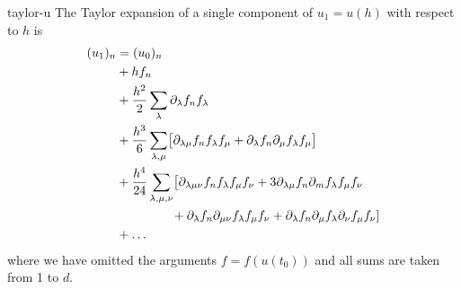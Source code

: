 \begin{Lemma}{taylor-u}
  The Taylor expansion of a single component of $u_1 = u(h)$ with
  respect to $h$ is
  \begin{gather}
    \label{eq:taylor-u:1}
    \begin{split}
      (u_1)_n &= (u_0)_n
      \\& + h f_n
      \\& + \frac{h^2}2 \sum_\lambda \partial_{\lambda} f_n f_\lambda
      \\& + \frac{h^3}6 \sum_{\lambda,\mu} \bigl[\partial_{\lambda\mu} f_n f_\lambda f_\mu
      + \partial_{\lambda}f_n \partial_{\mu}f_\lambda f_\mu\bigr]
      \\& + \frac{h^4}{24} \sum_{\lambda,\mu,\nu}
      \bigl[\partial_{\lambda\mu\nu} f_n f_\lambda f_\mu f_\nu
      + 3\partial_{\lambda\mu} f_n \partial_{m}f_\lambda f_\mu f_\nu
      \\&\left.\hphantom{+\frac{h^4}{24} \sum_{\lambda,\mu,\nu}}
      + \partial_{\lambda}f_n \partial_{\mu\nu} f_\lambda f_\mu f_\nu
      + \partial_{\lambda}f_n \partial_{\mu} f_\lambda \partial_{\nu} f_\mu f_\nu
      \right]
      \\&+\dots
    \end{split}
  \end{gather}
  where we have omitted the arguments $f = f(u(t_0))$ and all sums are
  taken from 1 to $d$.
\end{Lemma}

